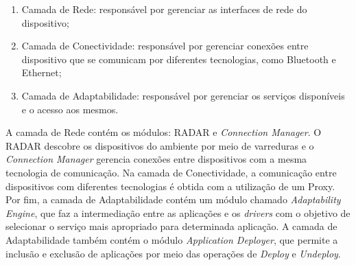 	\begin{enumerate}
		\item Camada de Rede: responsável por gerenciar as interfaces de rede do dispositivo;
		\item Camada de Conectividade: responsável por gerenciar conexões entre dispositivo que se comunicam por diferentes tecnologias, como Bluetooth e Ethernet;
		\item Camada de Adaptabilidade: responsável por gerenciar os serviços disponíveis e o acesso aos mesmos.
	\end{enumerate}

	A camada de Rede contém os módulos: RADAR e \textit{Connection Manager}. O RADAR descobre os dispositivos do ambiente por meio de varreduras e o \textit{Connection Manager} gerencia conexões entre dispositivos com a mesma tecnologia de comunicação. Na camada de Conectividade, a comunicação entre dispositivos com diferentes tecnologias é obtida com a utilização de um Proxy. Por fim, a camada de Adaptabilidade contém um módulo chamado \textit{Adaptability Engine}, que faz a intermediação entre as aplicações e os \textit{drivers} com o objetivo de selecionar o serviço mais apropriado para determinada aplicação. A camada de Adaptabilidade também contém o módulo \textit{Application Deployer}, que permite a inclusão e exclusão de aplicações por meio das operações de \textit{Deploy} e \textit{Undeploy}.





